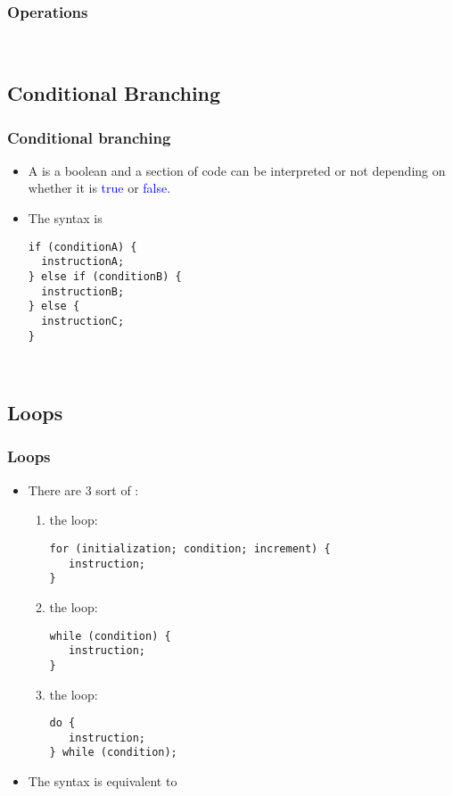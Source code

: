 \begin{frame}
  \frametitle<presentation>{Operations}
  \begin{example}~\par
    
  \end{example}
\end{frame}

\subsection{Conditional Branching}
\begin{frame}[fragile]
  \frametitle<presentation>{Conditional branching}
  \begin{itemize}
  \item A  is a boolean and a section of code
    can be interpreted or not depending on whether it is
    \textcolor{blue}{true} or \textcolor{blue}{false}.
  \item The syntax is
\begin{verbatim}
if (conditionA) {
  instructionA;
} else if (conditionB) {
  instructionB;
} else {
  instructionC;
}
\end{verbatim}
  \end{itemize}
\end{frame}

\begin{frame}
  \begin{example}~\par

    
  \end{example}
\end{frame}

\subsection{Loops}
\begin{frame}[fragile]
  \frametitle<presentation>{Loops}
  \begin{itemize}
  \item There are 3 sort of :
    \begin{enumerate}
    \item the  loop:
      \begin{verbatim}
for (initialization; condition; increment) {
   instruction;
}
    \end{verbatim}
    \item the  loop:
      \begin{verbatim}
while (condition) {
   instruction;
}
    \end{verbatim}
    \item the  loop:
      \begin{verbatim}
do {
   instruction;
} while (condition);
    \end{verbatim}
    \end{enumerate}
  \item The syntax  is equivalent to 
  \end{itemize}
\end{frame}

